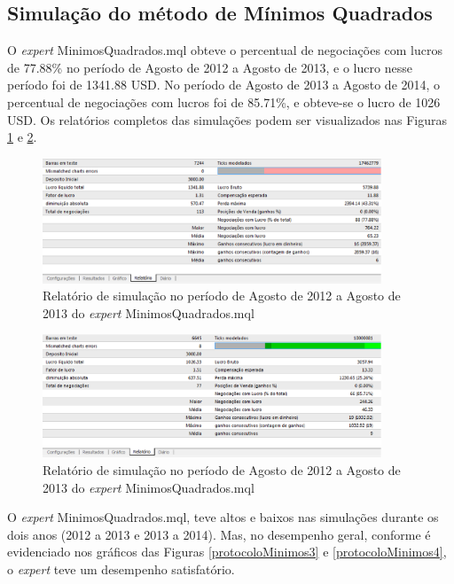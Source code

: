 \subsection{Simulação do método de Mínimos Quadrados}

O \textit{expert} MinimosQuadrados.mql obteve o percentual de negociações com lucros de 77.88\% no período de Agosto de 2012 a Agosto de 2013, e o  lucro nesse período foi de 1341.88 USD. No período de Agosto de 2013 a Agosto de 2014, o percentual de negociações com lucros foi de 85.71\%,  e obteve-se o lucro de 1026 USD. 
Os relatórios completos das simulações podem ser visualizados nas Figuras \ref{protocoloMinimos} e \ref{protocoloMinimos2}.

\begin{figure}[H]
\centering
\includegraphics[width=0.9\textwidth]{figuras/protocoloMinimos}
\caption{Relatório de simulação no período de Agosto de 2012 a Agosto de 2013 do \textit{expert} MinimosQuadrados.mql}
\label{protocoloMinimos}
\end{figure}

\begin{figure}[H]
\centering
\includegraphics[width=0.9\textwidth]{figuras/protocoloMinimos2}
\caption{Relatório de simulação no período de Agosto de 2012 a Agosto de 2013 do \textit{expert} MinimosQuadrados.mql}
\label{protocoloMinimos2}
\end{figure}

O \textit{expert} MinimosQuadrados.mql, teve altos e baixos nas simulações durante os dois anos (2012 a 2013 e 2013 a 2014). Mas, no desempenho geral, conforme é evidenciado nos gráficos das Figuras \ref{protocoloMinimos3} e \ref{protocoloMinimos4}, o \textit{expert} teve um desempenho satisfatório.


